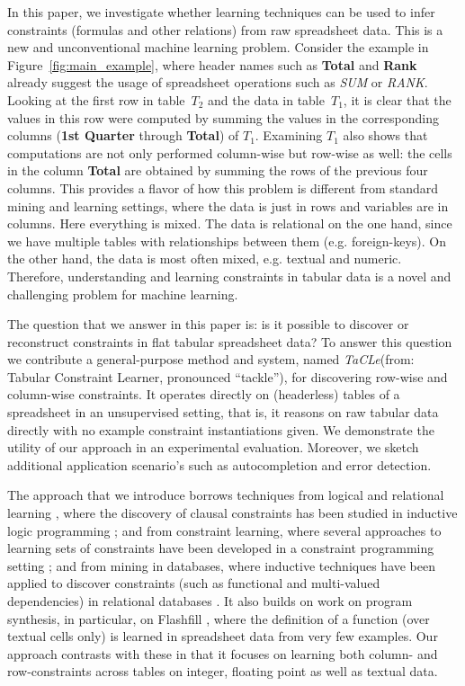 \documentclass{IEEEtran}
\newcommand{\format}[1]{\textit{#1}\xspace}
\newcommand{\sname}{\format{TaCLe}}
\theoremstyle{definition}
\begin{document}
In this paper,  we investigate whether learning techniques can be used to infer constraints (formulas and other relations) from raw spreadsheet data.
This is a new and unconventional machine learning problem.
Consider the example in Figure~\ref{fig:main_example}, where header names such as \textbf{Total} and \textbf{Rank} already suggest the usage of spreadsheet operations such as \textit{SUM} or \textit{RANK}.
Looking at the first row in table~$T_2$ and the data in table~$T_1$, it is clear that the values in this row were computed by summing the values in the corresponding columns (\textbf{1st Quarter} through \textbf{Total}) of $T_1$.
Examining $T_1$ also shows that computations are not only performed column-wise but row-wise as well: the cells in the column \textbf{Total} are obtained by summing the rows of the previous four columns.
This provides a flavor of how this problem is different from standard mining and learning settings, where the data is just in rows and variables are in columns. Here everything is mixed. The data is relational on the one hand, since we have multiple tables with relationships between them (e.g. foreign-keys). On the other hand, the data is most often mixed, e.g. textual and numeric. %
Therefore, understanding and learning constraints in tabular data is a novel and challenging problem for machine learning.

The question that we answer in this paper is: is it possible to discover or reconstruct constraints in flat tabular spreadsheet data?
To answer this question we contribute a general-purpose method and system, named \sname (from: Tabular Constraint Learner, pronounced ``tackle''), for discovering row-wise and column-wise constraints.
It operates directly on (headerless) tables of a spreadsheet in an unsupervised setting, that is, it reasons on raw tabular data directly with no example constraint instantiations given. %
We demonstrate the utility of our approach in an experimental evaluation.
Moreover, we sketch additional application scenario's such as autocompletion and error detection.

The approach that we introduce borrows techniques from logical and relational learning \cite{luc_book}, where the discovery of clausal constraints has been studied in inductive logic programming \cite{claudien,lallouet}; and from constraint learning,  where several approaches to learning sets of constraints have been developed in a constraint programming setting \cite{Quacq,Conacq,modelseeker};
and from mining in databases, where inductive techniques have been applied to discover constraints (such as functional and multi-valued dependencies) in relational databases \cite{savnik}.  It also builds on work on program synthesis, in particular, on Flashfill \cite{flashfill}, where the definition of a function (over textual cells only) is learned in spreadsheet data from
very few examples.
Our approach contrasts with these in that it focuses on learning both column- and row-constraints across tables on integer, floating point as well as textual data.
\end{document}
